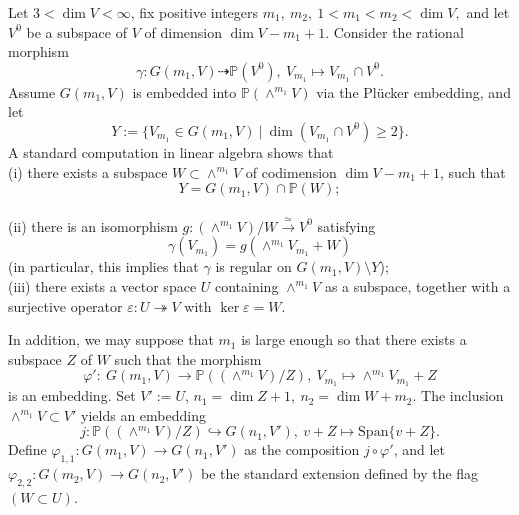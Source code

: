 \documentclass[12pt]{amsart}
\renewcommand{\phi}{\varphi}
\theoremstyle{definition}
\begin{document}
Let $3<\dim V<\infty$, fix positive integers $m_1,\ m_2,\ 
1< m_1< m_2<\dim V,$ and let $V^0$ be a subspace of $V$ of 
dimension $\dim V-m_1+1$. Consider the rational morphism
\begin{equation*}\label{linear prn p}
\gamma:G(m_1,V)\dasharrow\mathbb{P}(V^0),\ V_{m_1}\mapsto  
V_{m_1}\cap V^0.
\end{equation*}
Assume $G(m_1,V)$ is embedded into $\mathbb{P}(\wedge^{m_1}V)$ 
via the Pl\"ucker embedding, and let $$Y:=\{V_{m_1}\in G(m_1,V
)\ |\ \dim(V_{m_1}\cap V^0)\ge2\}.$$ A standard computation in 
linear algebra shows that\\ 
(i) there exists a subspace $W\subset\wedge^{m_1}V$ of 
codimension $\dim V-m_1+1$, such that 
$$Y=G(m_1,V)\cap \mathbb{P}(W);$$\\ 
(ii) there is an isomorphism $g:(\wedge^{m_1}V)/W
\xrightarrow{\simeq}V^0$ satisfying 
\begin{equation}\label{p vs g}
\gamma(V_{m_1})=g(\wedge^{m_1}V_{m_1}+W)
\end{equation}
(in particular, this implies that $\gamma$ is regular on 
$G(m_1,V)\setminus Y$);\\
(iii) there exists a vector space $U$ containing $\wedge^{m_1}
V$ as a subspace, together with a surjective operator 
$\varepsilon:U\twoheadrightarrow V$ with $\ker\varepsilon=W$. 


In addition, we may suppose that $m_1$ is 
large enough so that there exists a subspace $Z$ of $W$ such 
that the morphism $$\phi':\ G(m_1,V)\to \mathbb{P}((\wedge^{m_1}
V)/Z),\ V_{m_1}\mapsto\wedge^{m_1}V_{m_1}+Z$$ is an embedding.
Set $V':=U$, $n_1=\dim Z+1,\ n_2=\dim W+m_2$. The inclusion
$\wedge^{m_1}V\subset V'$ yields an embedding $$j:\mathbb{P}((
\wedge^{m_1}V)/Z)\hookrightarrow G(n_1,V'),\ v+Z\mapsto
\mathrm{Span}\{v+Z\}.$$ Define $\varphi_{1,1}: G(m_1,V)\to 
G(n_1,V')$ as the composition $j\circ\phi'$, and let 
$\varphi_{2,2}:G(m_2,V)\to G(n_2,V')$ be the standard 
extension defined by the flag $(W\subset U)$. 
\end{document}
